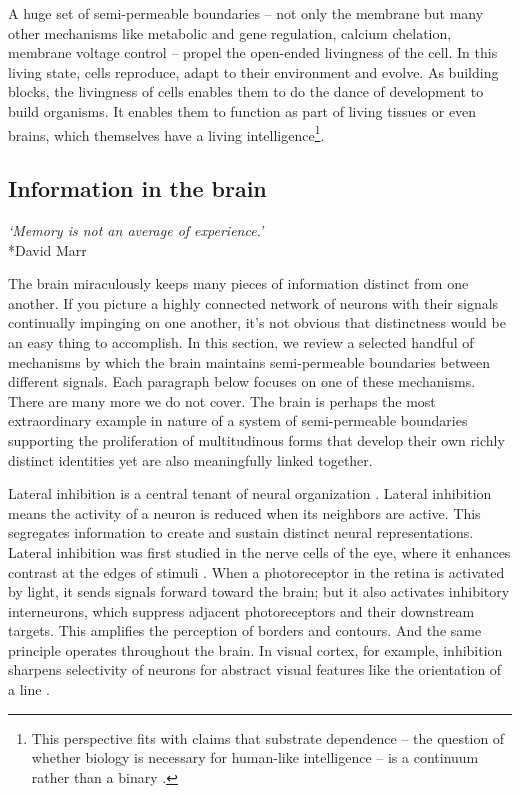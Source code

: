 \documentclass[12pt]{article}
\begin{document}

A huge set of semi-permeable boundaries -- not only the membrane but many other mechanisms like metabolic and gene regulation, calcium chelation, membrane voltage control -- propel the open-ended livingness of the cell. In this living state, cells reproduce, adapt to their environment and evolve. As building blocks, the livingness of cells enables them to do the dance of development to build organisms. It enables them to function as part of living tissues or even brains, which themselves have a living intelligence\footnote{This perspective fits with claims that substrate dependence -- the question of whether biology is necessary for human-like intelligence -- is a continuum rather than a binary \citep{clark2008supersizing, humphreys2004extending}.}.


\subsection{Information in the brain}

\begin{center}
\textit{`Memory is not an average of experience.'}\\*David Marr
\end{center}


The brain miraculously keeps many pieces of information distinct from one another. If you picture a highly connected network of neurons with their signals continually impinging on one another, it's not obvious that distinctness would be an easy thing to accomplish. In this section, we review a selected handful of mechanisms by which the brain maintains semi-permeable boundaries between different signals. Each paragraph below focuses on one of these mechanisms. There are many more we do not cover. The brain is perhaps the most extraordinary example in nature of a system of semi-permeable boundaries supporting the proliferation of multitudinous forms that develop their own richly distinct identities yet are also meaningfully linked together.

Lateral inhibition is a central tenant of neural organization \citep{isaacson2011inhibition, hubel1962receptive, douglas2004neuronal}. Lateral inhibition means the activity of a neuron is reduced when its neighbors are active. This segregates information to create and sustain distinct neural representations. Lateral inhibition was first studied in the nerve cells of the eye, where it enhances contrast at the edges of stimuli \citep{hartline1956inhibition}. When a photoreceptor in the retina is activated by light, it sends signals forward toward the brain; but it also activates inhibitory interneurons, which suppress adjacent photoreceptors and their downstream targets. This amplifies the perception of borders and contours. And the same principle operates throughout the brain. In visual cortex, for example, inhibition sharpens selectivity of neurons for abstract visual features like the orientation of a line \citep{sillito1975contribution}. 
\end{document}

